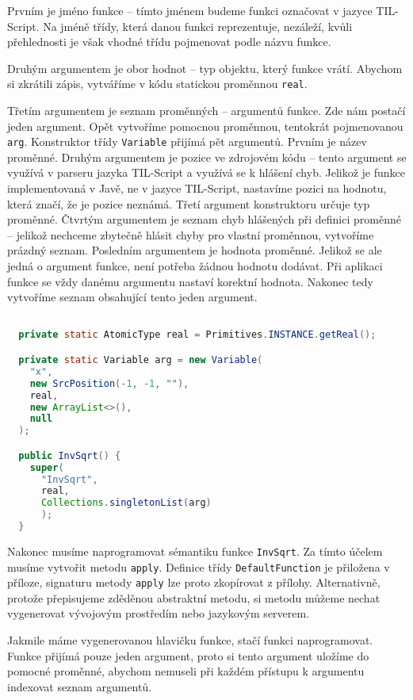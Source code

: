 Prvním je jméno funkce -- tímto jménem budeme funkci označovat v jazyce TIL-Script. Na jméně třídy,
která danou funkci reprezentuje, nezáleží, kvůli přehlednosti je však vhodné třídu pojmenovat podle
názvu funkce.

Druhým argumentem je obor hodnot -- typ objektu, který funkce vrátí. Abychom si zkrátili zápis,
vytváříme v kódu statickou proměnnou \lstinline{real}.

Třetím argumentem je seznam proměnných -- argumentů funkce. Zde nám postačí jeden argument. Opět
vytvoříme pomocnou proměnnou, tentokrát pojmenovanou \lstinline{arg}. Konstruktor třídy
\lstinline{Variable} přijímá pět argumentů. Prvním je název proměnné. Druhým argumentem je pozice
ve zdrojovém kódu -- tento argument se využívá v parseru jazyka TIL-Script a využívá se k hlášení
chyb. Jelikož je funkce implementovaná v Javě, ne v jazyce TIL-Script, nastavíme pozici na hodnotu,
která značí, že je pozice neznámá. Třetí argument konstruktoru určuje typ proměnné. Čtvrtým
argumentem je seznam chyb hlášených při definici proměnné -- jelikož nechceme zbytečně hlásit chyby
pro vlastní proměnnou, vytvoříme prázdný seznam. Posledním argumentem je hodnota proměnné. Jelikož
se ale jedná o argument funkce, není potřeba žádnou hodnotu dodávat. Při aplikaci funkce se vždy
danému argumentu nastaví korektní hodnota. Nakonec tedy vytvoříme seznam obsahující tento jeden
argument.

\begin{lstlisting}[caption={Konstruktor InvSqrt}, language=Java]

  private static AtomicType real = Primitives.INSTANCE.getReal();

  private static Variable arg = new Variable(
    "x",
    new SrcPosition(-1, -1, ""),
    real,
    new ArrayList<>(),
    null
  );

  public InvSqrt() {
    super(
      "InvSqrt",
      real,
      Collections.singletonList(arg)
      );
  }
\end{lstlisting}

Nakonec musíme naprogramovat sémantiku funkce \lstinline{InvSqrt}. Za tímto účelem musíme vytvořit
metodu \lstinline{apply}. Definice třídy \lstinline{DefaultFunction} je přiložena v příloze,
signaturu metody \lstinline{apply} lze proto zkopírovat z přílohy.
Alternativně, protože přepisujeme zděděnou abstraktní metodu, si metodu můžeme nechat
vygenerovat vývojovým prostředím nebo jazykovým serverem.

Jakmile máme vygenerovanou hlavičku funkce, stačí funkci naprogramovat. Funkce přijímá pouze jeden
argument, proto si tento argument uložíme do pomocné proměnné, abychom nemuseli při každém
přístupu k argumentu indexovat seznam argumentů.

